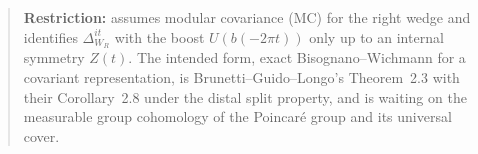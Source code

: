 \begin{quote}
    \textbf{Restriction:} assumes modular covariance (MC) for the right wedge and identifies $\Delta_{W_R}^{it}$ with the boost $U(b(-2\pi t))$ only up to an internal symmetry $Z(t)$. The intended form, exact Bisognano--Wichmann for a covariant representation, is Brunetti--Guido--Longo's Theorem~2.3 with their Corollary~2.8 under the distal split property, and is waiting on the measurable group cohomology of the Poincar\'e group and its universal cover.
\end{quote}
